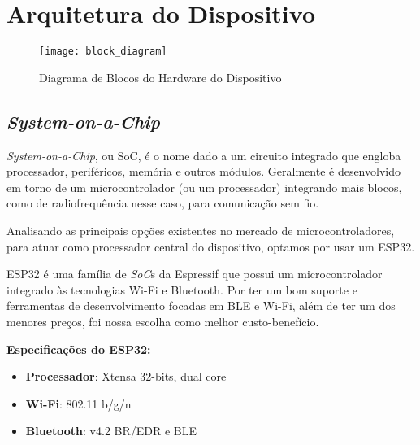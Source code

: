 \documentclass[monografia.tex]{subfiles}
\begin{document}
\section{Arquitetura do Dispositivo} %

\begin{figure}[h!]
    \texttt{[image: block\_diagram]}
    \caption{Diagrama de Blocos do Hardware do Dispositivo}
    \label{fig:Diagrama de Blocos}
\end{figure}

\subsection{\textit{System-on-a-Chip}}

\textit{System-on-a-Chip}, ou SoC, é o nome dado a um circuito integrado que engloba processador, periféricos, memória e outros módulos. Geralmente é desenvolvido em torno de um microcontrolador (ou um processador) integrando mais blocos, como de radiofrequência nesse caso, para comunicação sem fio.

Analisando as principais opções existentes no mercado de microcontroladores, para atuar como processador central do dispositivo, optamos por usar um ESP32. 

ESP32\cite{ESP32} é uma família de \textit{SoC}s da Espressif que possui um microcontrolador integrado às tecnologias Wi-Fi e Bluetooth. Por ter um bom suporte e ferramentas de desenvolvimento focadas em BLE e Wi-Fi, além de ter um dos menores preços, foi nossa escolha como melhor custo-benefício. 

 

\textbf{Especificações do ESP32:} \cite{ESP-datasheet}
\begin{itemize}
\item \textbf{Processador}: Xtensa 32-bits, dual core
\item \textbf{Wi-Fi}: 802.11 b/g/n
\item \textbf{Bluetooth}: v4.2 BR/EDR e BLE
\end{itemize}
\end{document}
